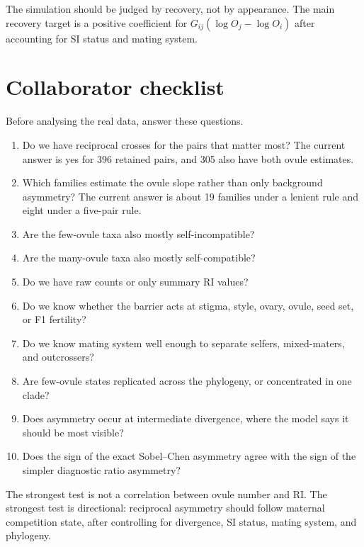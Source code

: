 \documentclass[12pt]{article}
\begin{document}
\begin{conclusionbox}
The simulation should be judged by recovery, not by appearance. The main recovery target is a positive coefficient for $G_{ij}(\log O_j-\log O_i)$ after accounting for SI status and mating system.
\end{conclusionbox}

\section{Collaborator checklist}

Before analysing the real data, answer these questions.

\begin{enumerate}
\item Do we have reciprocal crosses for the pairs that matter most? The current answer is yes for 396 retained pairs, and 305 also have both ovule estimates.
\item Which families estimate the ovule slope rather than only background asymmetry? The current answer is about 19 families under a lenient rule and eight under a five-pair rule.
\item Are the few-ovule taxa also mostly self-incompatible?
\item Are the many-ovule taxa also mostly self-compatible?
\item Do we have raw counts or only summary RI values?
\item Do we know whether the barrier acts at stigma, style, ovary, ovule, seed set, or F1 fertility?
\item Do we know mating system well enough to separate selfers, mixed-maters, and outcrossers?
\item Are few-ovule states replicated across the phylogeny, or concentrated in one clade?
\item Does asymmetry occur at intermediate divergence, where the model says it should be most visible?
\item Does the sign of the exact Sobel--Chen asymmetry agree with the sign of the simpler diagnostic ratio asymmetry?
\end{enumerate}

\begin{conclusionbox}
The strongest test is not a correlation between ovule number and RI. The strongest test is directional: reciprocal asymmetry should follow maternal competition state, after controlling for divergence, SI status, mating system, and phylogeny.
\end{conclusionbox}
\end{document}
